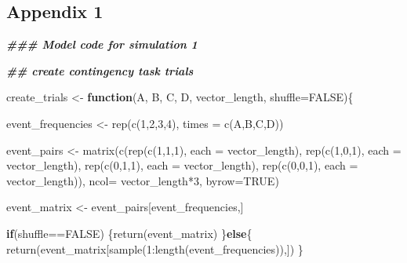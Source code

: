 \documentclass[
  english,
  man,floatsintext]{apa6}
\newenvironment{Shaded}{\begin{snugshade}}{\end{snugshade}}
\newcommand{\DecValTok}[1]{\textcolor[rgb]{0.00,0.00,0.81}{#1}}
\newcommand{\ConstantTok}[1]{\textcolor[rgb]{0.00,0.00,0.00}{#1}}
\newcommand{\SpecialCharTok}[1]{\textcolor[rgb]{0.00,0.00,0.00}{#1}}
\newcommand{\DocumentationTok}[1]{\textcolor[rgb]{0.56,0.35,0.01}{\textbf{\textit{#1}}}}
\newcommand{\OtherTok}[1]{\textcolor[rgb]{0.56,0.35,0.01}{#1}}
\newcommand{\FunctionTok}[1]{\textcolor[rgb]{0.00,0.00,0.00}{#1}}
\newcommand{\ControlFlowTok}[1]{\textcolor[rgb]{0.13,0.29,0.53}{\textbf{#1}}}
\newcommand{\AttributeTok}[1]{\textcolor[rgb]{0.77,0.63,0.00}{#1}}
\newcommand{\NormalTok}[1]{#1}
\begin{document}
\begin{appendix}
\hypertarget{appendix-1}{%
\section{Appendix 1}\label{appendix-1}}

\begin{Shaded}
\begin{Highlighting}[]
\DocumentationTok{\#\#\# Model code for simulation 1}

\DocumentationTok{\#\# create contingency task trials}

\NormalTok{create\_trials }\OtherTok{\textless{}{-}} \ControlFlowTok{function}\NormalTok{(A, B, C, D, vector\_length, }\AttributeTok{shuffle=}\ConstantTok{FALSE}\NormalTok{)\{}

\NormalTok{  event\_frequencies }\OtherTok{\textless{}{-}} \FunctionTok{rep}\NormalTok{(}\FunctionTok{c}\NormalTok{(}\DecValTok{1}\NormalTok{,}\DecValTok{2}\NormalTok{,}\DecValTok{3}\NormalTok{,}\DecValTok{4}\NormalTok{), }\AttributeTok{times =} \FunctionTok{c}\NormalTok{(A,B,C,D))}

\NormalTok{  event\_pairs }\OtherTok{\textless{}{-}} \FunctionTok{matrix}\NormalTok{(}\FunctionTok{c}\NormalTok{(}\FunctionTok{rep}\NormalTok{(}\FunctionTok{c}\NormalTok{(}\DecValTok{1}\NormalTok{,}\DecValTok{1}\NormalTok{,}\DecValTok{1}\NormalTok{), }\AttributeTok{each =}\NormalTok{ vector\_length),}
\FunctionTok{rep}\NormalTok{(}\FunctionTok{c}\NormalTok{(}\DecValTok{1}\NormalTok{,}\DecValTok{0}\NormalTok{,}\DecValTok{1}\NormalTok{), }\AttributeTok{each =}\NormalTok{ vector\_length),}
\FunctionTok{rep}\NormalTok{(}\FunctionTok{c}\NormalTok{(}\DecValTok{0}\NormalTok{,}\DecValTok{1}\NormalTok{,}\DecValTok{1}\NormalTok{), }\AttributeTok{each =}\NormalTok{ vector\_length),}
\FunctionTok{rep}\NormalTok{(}\FunctionTok{c}\NormalTok{(}\DecValTok{0}\NormalTok{,}\DecValTok{0}\NormalTok{,}\DecValTok{1}\NormalTok{), }\AttributeTok{each =}\NormalTok{ vector\_length)),}
\AttributeTok{ncol=}\NormalTok{ vector\_length}\SpecialCharTok{*}\DecValTok{3}\NormalTok{,}
\AttributeTok{byrow=}\ConstantTok{TRUE}\NormalTok{)}

\NormalTok{  event\_matrix }\OtherTok{\textless{}{-}}\NormalTok{ event\_pairs[event\_frequencies,]}

\ControlFlowTok{if}\NormalTok{(shuffle}\SpecialCharTok{==}\ConstantTok{FALSE}\NormalTok{) \{}\FunctionTok{return}\NormalTok{(event\_matrix)}
\NormalTok{    \}}\ControlFlowTok{else}\NormalTok{\{}
\FunctionTok{return}\NormalTok{(event\_matrix[}\FunctionTok{sample}\NormalTok{(}\DecValTok{1}\SpecialCharTok{:}\FunctionTok{length}\NormalTok{(event\_frequencies)),])}
\NormalTok{    \}}


\end{Highlighting}
\end{Shaded}
\end{appendix}
\end{document}
